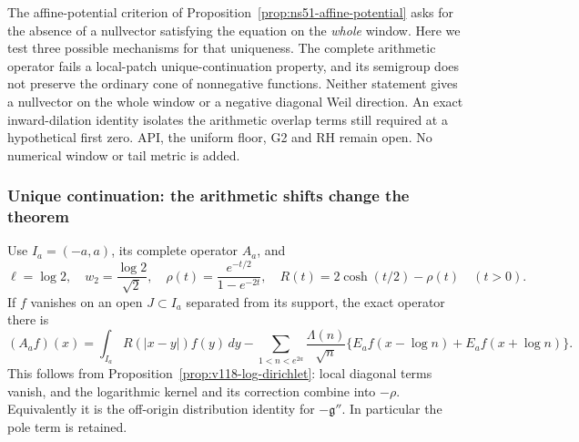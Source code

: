 \documentclass[11pt]{article}
\theoremstyle{remark}
\begin{document}
The affine-potential criterion of Proposition~\ref{prop:ns51-affine-potential}
asks for the absence of a nullvector satisfying the equation on the
\emph{whole} window. Here we test three possible mechanisms for that
uniqueness. The complete arithmetic operator fails a local-patch
unique-continuation property, and its semigroup does not preserve the
ordinary cone of nonnegative functions. Neither statement gives a
nullvector on the whole window or a negative diagonal Weil direction.
An exact inward-dilation identity isolates the arithmetic overlap
terms still required at a hypothetical first zero. API, the uniform
floor, G2 and RH remain open. No numerical window or tail metric is added.

\subsubsection{Unique continuation: the arithmetic shifts change the theorem}

Use $I_a=(-a,a)$, its complete operator $A_a$, and
\[
 \ell=\log2,\quad w_2=\frac{\log2}{\sqrt2},\quad
 \rho(t)=\frac{e^{-t/2}}{1-e^{-2t}},\quad
 R(t)=2\cosh(t/2)-\rho(t)\quad(t>0).
\]
If $f$ vanishes on an open $J\subset I_a$ separated from its support,
the exact operator there is
\begin{equation}\label{eq:ns55-off-support-operator}
 (A_af)(x)=\int_{I_a}R(|x-y|)f(y)\,dy
 -\sum_{1<n<e^{2a}}\frac{\Lambda(n)}{\sqrt n}
       \{E_af(x-\log n)+E_af(x+\log n)\}.
\end{equation}
This follows from Proposition~\ref{prop:v118-log-dirichlet}: local
diagonal terms vanish, and the logarithmic kernel and its correction
combine into $-\rho$. Equivalently it is the off-origin distribution
identity for $-\mathfrak g''$. In particular the pole term is retained.
\end{document}
